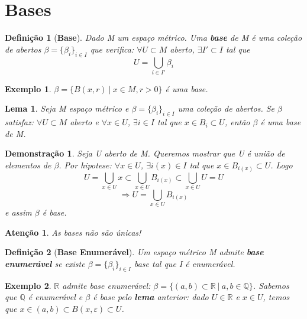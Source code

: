 \documentclass{article}
\newtheorem*{definition}{Definição}
\newtheorem*{exemplo}{Exemplo}
\newtheorem*{atencao}{Atenção}
\newtheorem*{lema}{Lema}
\newtheorem*{prova}{Demonstração}
\newcommand{\R}{\mathbb{R}}
\newcommand{\eps}{\varepsilon}
\begin{document}
\section{Bases}

\begin{definition}[\textbf{Base}]
    Dado M um espaço métrico. Uma \textbf{base} de M é uma coleção de abertos
    $\beta = \{\beta_i\}_{i \in I}$ que verifica:
    $\forall U \subset M$ aberto, $\exists I' \subset I$ tal que 
    \[U = \bigcup_{i \in I'} \beta _i\] 
\end{definition}

\begin{exemplo}
    $\beta = \{B(x, r) \: | \: x \in M, r > 0\}$ é uma base.
\end{exemplo}

\begin{lema}
    Seja M espaço métrico e $\beta = \{\beta_i\}_{i \in I}$ uma coleção de abertos.
    Se $\beta$ satisfaz: $\forall U \subset M$ aberto e $\forall x \in U$, $\exists i \in I$ 
    tal que $x \in B_i \subset U$, então $\beta$ é uma base de M.
\end{lema}

\begin{prova}
    Seja U aberto de M. 
    Queremos mostrar que U é união de elementos de $\beta$.
    Por hipotese: $\forall x \in U$, $\exists i(x) \in I$ tal que $x \in B_{i(x)} \subset U$.
    Logo 
    \[U = \bigcup_{x \in U} x \subset \bigcup_{x \in U} B_{i(x)} \subset \bigcup_{x \in U} U = U\]
    \[\Rightarrow U = \bigcup_{x \in U} B_{i(x)}\]
     e assim $\beta$ é base.
\end{prova}

\begin{atencao}
    As bases não são únicas!
\end{atencao}

\begin{definition}[\textbf{Base Enumerável}]
    Um espaço métrico M admite \textbf{base enumerável} se existe $\beta = \{\beta_i\}_{i \in I}$ base
    tal que I é enumerável. 
\end{definition}

\begin{exemplo}
    $\R$ admite base enumerável: $\beta = \{ (a, b) \subset \R \: | \: a, b \in \mathbb{Q} \}$.
    Sabemos que $\mathbb{Q}$ é enumerável e $\beta$ é base pelo \textbf{lema} anterior:
    dado $U \in \R$ e $x \in U$, temos que $x \in (a, b) \subset B(x, \eps) \subset U$.
\end{exemplo}
\end{document}
